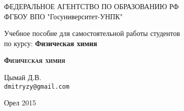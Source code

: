 \begin{titlepage}
\newpage

\begin{center}
ФЕДЕРАЛЬНОЕ АГЕНТСТВО ПО ОБРАЗОВАНИЮ РФ \\
\vspace{1cm}
ФГБОУ ВПО "Госуниверситет-УНПК"\\
\hrulefill
\end{center}
 

\vspace{8em}

\begin{center}
\Large Учебное пособие для самостоятельной работы студентов \\ по курсу: \textbf{Физическая химия}
\end{center}

\vspace{2.5em}
 
\begin{center}
\textsc{\textbf{Физическая химия}}
\end{center}

\vspace{6em}
 
\begin{flushleft}
\vspace{1.5em}
Цымай Д.В. \\
\texttt{dmitryzy@gmail.com}
\end{flushleft}
 
\vspace{\fill}

\begin{center}
Орел 2015
\end{center}

\end{titlepage}